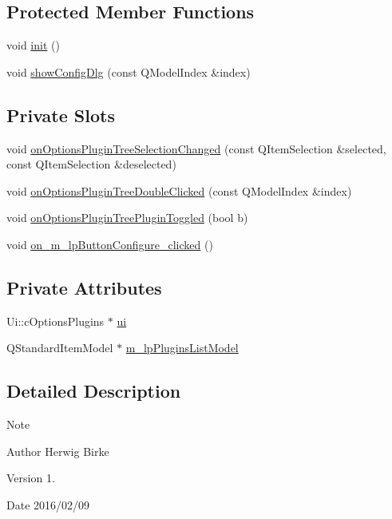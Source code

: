 \subsection*{Protected Member Functions}
\begin{DoxyCompactItemize}
\item 
void \hyperlink{classc_options_plugins_acca2bbe1e1858e0038bb72416087687f}{init} ()
\item 
void \hyperlink{classc_options_plugins_a102ea2333b1b8cdb69135dbd2ca10bed}{show\+Config\+Dlg} (const Q\+Model\+Index \&index)
\end{DoxyCompactItemize}
\subsection*{Private Slots}
\begin{DoxyCompactItemize}
\item 
void \hyperlink{classc_options_plugins_a5e2c5668263a06190103ed275a7f5df4}{on\+Options\+Plugin\+Tree\+Selection\+Changed} (const Q\+Item\+Selection \&selected, const Q\+Item\+Selection \&deselected)
\item 
void \hyperlink{classc_options_plugins_a60d4d685600b74b3bd8b6a3973270db3}{on\+Options\+Plugin\+Tree\+Double\+Clicked} (const Q\+Model\+Index \&index)
\item 
void \hyperlink{classc_options_plugins_a41dfaea4a44e2eed173402bcaa42d0d7}{on\+Options\+Plugin\+Tree\+Plugin\+Toggled} (bool b)
\item 
void \hyperlink{classc_options_plugins_a55f1014d084453544ac054379094ebdb}{on\+\_\+m\+\_\+lp\+Button\+Configure\+\_\+clicked} ()
\end{DoxyCompactItemize}
\subsection*{Private Attributes}
\begin{DoxyCompactItemize}
\item 
Ui\+::c\+Options\+Plugins $\ast$ \hyperlink{classc_options_plugins_aa5588423bcff87a624b984653a9cce6a}{ui}
\item 
Q\+Standard\+Item\+Model $\ast$ \hyperlink{classc_options_plugins_ab32e360c0936198360a2e48a431878da}{m\+\_\+lp\+Plugins\+List\+Model}
\end{DoxyCompactItemize}


\subsection{Detailed Description}
\begin{DoxyNote}{Note}

\end{DoxyNote}
\begin{DoxyAuthor}{Author}
Herwig Birke
\end{DoxyAuthor}
\begin{DoxyVersion}{Version}
1.
\end{DoxyVersion}
\begin{DoxyDate}{Date}
2016/02/09 
\end{DoxyDate}


